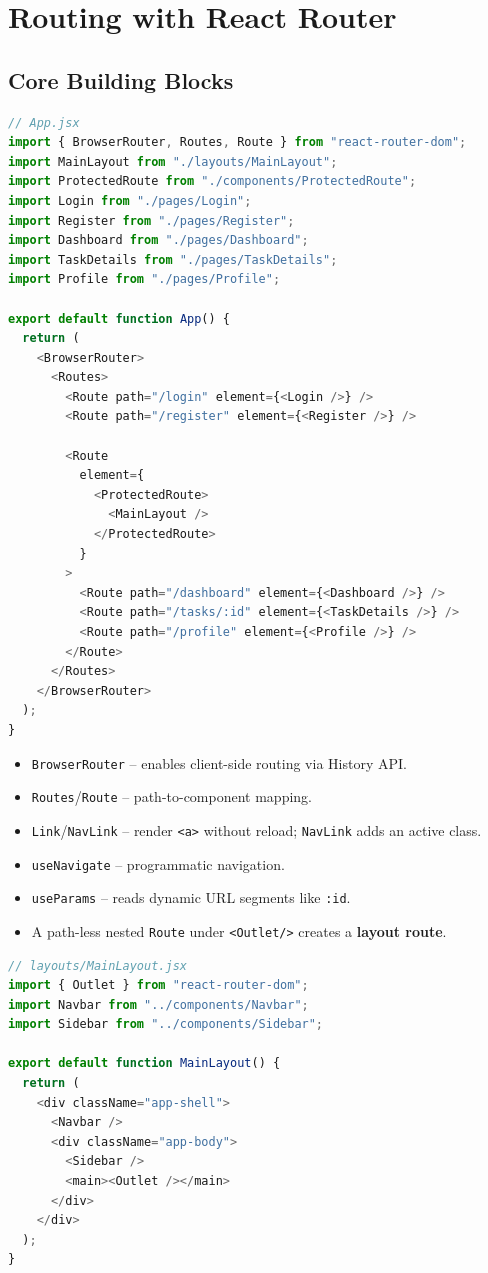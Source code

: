 \chapter{Routing with React Router}

\section{Core Building Blocks}

\begin{lstlisting}[language=JavaScript]
// App.jsx
import { BrowserRouter, Routes, Route } from "react-router-dom";
import MainLayout from "./layouts/MainLayout";
import ProtectedRoute from "./components/ProtectedRoute";
import Login from "./pages/Login";
import Register from "./pages/Register";
import Dashboard from "./pages/Dashboard";
import TaskDetails from "./pages/TaskDetails";
import Profile from "./pages/Profile";

export default function App() {
  return (
    <BrowserRouter>
      <Routes>
        <Route path="/login" element={<Login />} />
        <Route path="/register" element={<Register />} />

        <Route
          element={
            <ProtectedRoute>
              <MainLayout />
            </ProtectedRoute>
          }
        >
          <Route path="/dashboard" element={<Dashboard />} />
          <Route path="/tasks/:id" element={<TaskDetails />} />
          <Route path="/profile" element={<Profile />} />
        </Route>
      </Routes>
    </BrowserRouter>
  );
}
\end{lstlisting}

\begin{itemize}
  \item \texttt{BrowserRouter} -- enables client-side routing via History API.
  \item \texttt{Routes}/\texttt{Route} -- path-to-component mapping.
  \item \texttt{Link}/\texttt{NavLink} -- render \texttt{<a>} without reload; \texttt{NavLink} adds an active class.
  \item \texttt{useNavigate} -- programmatic navigation.
  \item \texttt{useParams} -- reads dynamic URL segments like \texttt{:id}.
  \item A path-less nested \texttt{Route} under \texttt{<Outlet/>} creates a \textbf{layout route}.
\end{itemize}

\begin{lstlisting}[language=JavaScript]
// layouts/MainLayout.jsx
import { Outlet } from "react-router-dom";
import Navbar from "../components/Navbar";
import Sidebar from "../components/Sidebar";

export default function MainLayout() {
  return (
    <div className="app-shell">
      <Navbar />
      <div className="app-body">
        <Sidebar />
        <main><Outlet /></main>
      </div>
    </div>
  );
}
\end{lstlisting}


